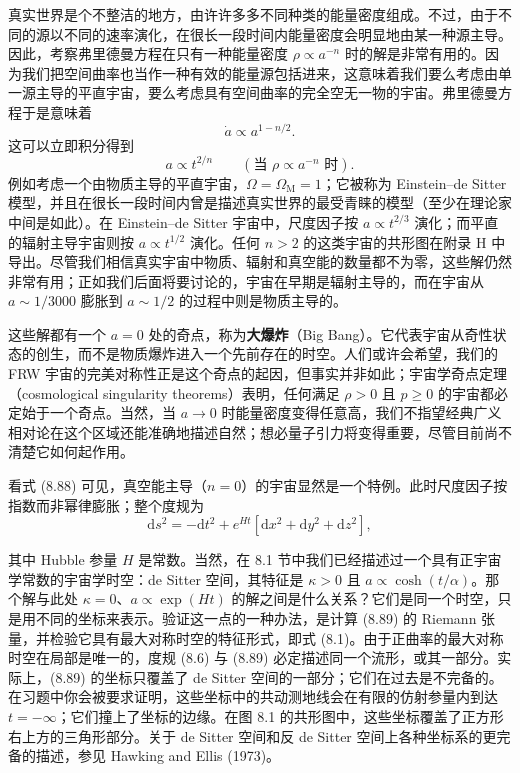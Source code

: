 真实世界是个不整洁的地方，由许许多多不同种类的能量密度组成。不过，由于不同的源以不同的速率演化，在很长一段时间内能量密度会明显地由某一种源主导。因此，考察弗里德曼方程在只有一种能量密度 $\rho\propto a^{-n}$ 时的解是非常有用的。因为我们把空间曲率也当作一种有效的能量源包括进来，这意味着我们要么考虑由单一源主导的平直宇宙，要么考虑具有空间曲率的完全空无一物的宇宙。弗里德曼方程于是意味着
\begin{equation*}
\dot{a}\propto a^{1-n/2}.
\tag{8.87}
\end{equation*}
这可以立即积分得到
\begin{equation*}
\boxed{\,a\propto t^{2/n}\qquad(\text{当 }\rho\propto a^{-n}\text{ 时}).\,}
\tag{8.88}
\end{equation*}
例如考虑一个由物质主导的平直宇宙，$\Omega=\Omega_{\mathrm{M}}=1$；它被称为 Einstein--de Sitter 模型，并且在很长一段时间内曾是描述真实世界的最受青睐的模型（至少在理论家中间是如此）。在 Einstein--de Sitter 宇宙中，尺度因子按 $a\propto t^{2/3}$ 演化；而平直的辐射主导宇宙则按 $a\propto t^{1/2}$ 演化。任何 $n>2$ 的这类宇宙的共形图在附录 H 中导出。尽管我们相信真实宇宙中物质、辐射和真空能的数量都不为零，这些解仍然非常有用；正如我们后面将要讨论的，宇宙在早期是辐射主导的，而在宇宙从 $a\sim1/3000$ 膨胀到 $a\sim1/2$ 的过程中则是物质主导的。

这些解都有一个 $a=0$ 处的奇点，称为\textbf{大爆炸}（Big Bang）。它代表宇宙从奇性状态的创生，而不是物质爆炸进入一个先前存在的时空。人们或许会希望，我们的 FRW 宇宙的完美对称性正是这个奇点的起因，但事实并非如此；宇宙学奇点定理（cosmological singularity theorems）表明，任何满足 $\rho>0$ 且 $p\ge0$ 的宇宙都必定始于一个奇点。当然，当 $a\to0$ 时能量密度变得任意高，我们不指望经典广义相对论在这个区域还能准确地描述自然；想必量子引力将变得重要，尽管目前尚不清楚它如何起作用。

看式 (8.88) 可见，真空能主导（$n=0$）的宇宙显然是一个特例。此时尺度因子按指数而非幂律膨胀；整个度规为
\begin{equation*}
\mathrm{d}s^{2} = -\mathrm{d}t^{2} + e^{Ht}[\mathrm{d}x^{2} + \mathrm{d}y^{2} + \mathrm{d}z^{2}],
\tag{8.89}
\end{equation*}

其中 Hubble 参量 $H$ 是常数。当然，在 8.1 节中我们已经描述过一个具有正宇宙学常数的宇宙学时空：de Sitter 空间，其特征是 $\kappa>0$ 且 $a\propto\cosh(t/\alpha)$。那个解与此处 $\kappa=0$、$a\propto\exp(Ht)$ 的解之间是什么关系？它们是同一个时空，只是用不同的坐标来表示。验证这一点的一种办法，是计算 (8.89) 的 Riemann 张量，并检验它具有最大对称时空的特征形式，即式 (8.1)。由于正曲率的最大对称时空在局部是唯一的，度规 (8.6) 与 (8.89) 必定描述同一个流形，或其一部分。实际上，(8.89) 的坐标只覆盖了 de Sitter 空间的一部分；它们在过去是不完备的。在习题中你会被要求证明，这些坐标中的共动测地线会在有限的仿射参量内到达 $t=-\infty$；它们撞上了坐标的边缘。在图 8.1 的共形图中，这些坐标覆盖了正方形右上方的三角形部分。关于 de Sitter 空间和反 de Sitter 空间上各种坐标系的更完备的描述，参见 Hawking and Ellis (1973)。


